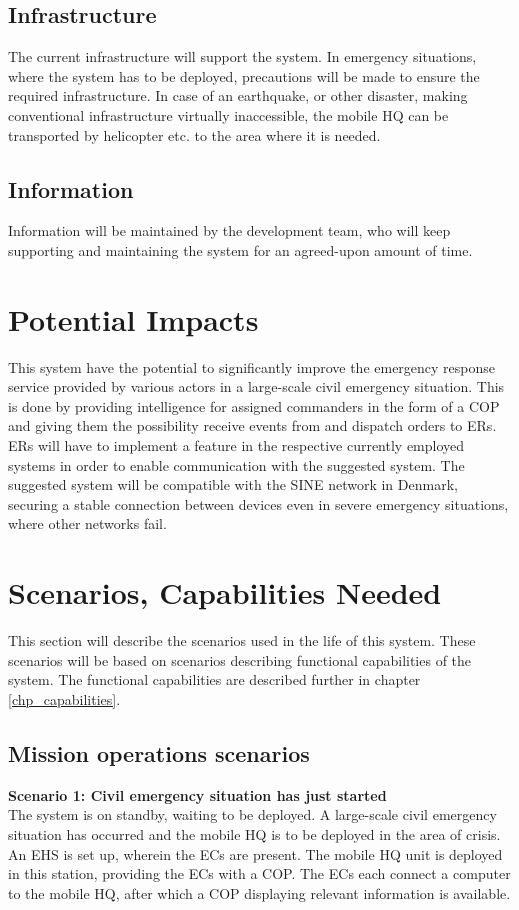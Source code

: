\subsection{Infrastructure}
The current infrastructure will support the system. In emergency situations, where the system has to be deployed, precautions will be made to ensure the required infrastructure.
In case of an earthquake, or other disaster, making conventional infrastructure virtually inaccessible, the mobile HQ can be transported by helicopter etc. to the area where it is needed.

\subsection{Information}
Information will be maintained by the development team, who will keep supporting and maintaining the system for an agreed-upon amount of time.


\section{Potential Impacts}
This system have the potential to significantly improve the emergency response service provided by various actors in a large-scale civil emergency situation. This is done by providing intelligence for assigned commanders in the form of a COP and giving them the possibility receive events from and dispatch orders to ERs. ERs will have to implement a feature in the respective currently employed systems in order to enable communication with the suggested system. 
The suggested system will be compatible with the SINE network in Denmark, securing a stable connection between devices even in severe emergency situations, where other networks fail.


\newpage
\section{Scenarios, Capabilities Needed}
\label{sec_scenarios}
This section will describe the scenarios used	in the life of this system. These scenarios will be based on scenarios describing functional capabilities of the system. The functional capabilities are described further in chapter \ref{chp_capabilities}.

\subsection{Mission operations scenarios}
\noindent \textbf{Scenario 1: Civil emergency situation has just started} \\
The system is on standby, waiting to be deployed. 
A large-scale civil emergency situation has occurred and the mobile HQ is to be deployed in the area of crisis. An EHS is set up, wherein the ECs are present. The mobile HQ unit is deployed in this station, providing the ECs with a COP. The ECs each connect a computer to the mobile HQ, after which a COP displaying relevant information is available.

